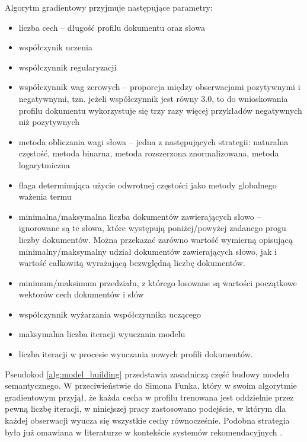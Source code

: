 \documentclass{pracamgr}
\begin{document}
Algorytm gradientowy przyjmuje następujące parametry:
\begin{itemize}
    \item liczba cech -- długość profilu dokumentu oraz słowa
    \item współczynik uczenia
    \item współczynnik regularyzacji
    \item współczynnik wag zerowych -- proporcja między obserwacjami pozytywnymi i negatywnymi, tzn. jeżeli współczynnik jest równy 3.0, to do wnioskowania profilu dokumentu wykorzystuje się trzy razy więcej przykładów negatywnych niż pozytywnych
    \item metoda obliczania wagi słowa -- jedna z następujących strategii: naturalna częstość, metoda binarna, metoda rozszerzona znormalizowana, metoda logarytmiczna
    \item flaga determinująca użycie odwrotnej częstości jako metody globalnego ważenia termu
    \item minimalna/maksymalna liczba dokumentów zawierających słowo -- ignorowane są te słowa, które występują poniżej/powyżej zadanego progu liczby dokumentów. Można przekazać zarówno wartość wymierną opisującą minimalny/maksymalny udział dokumentów zawierających słowo, jak i wartość całkowitą wyrażającą bezwględną liczbę dokumentów.
    \item minimum/maksimum przedziału, z którego losowane są wartości początkowe wektorów cech dokumentów i słów
    \item współczynnik wyżarzania współczynnika uczącego
    \item maksymalna liczba iteracji wyuczania modelu
    \item liczba iteracji w procesie wyuczania nowych profili dokumentów.
\end{itemize}

Pseudokod \ref{alg:model_building} przedstawia zasadniczą część budowy modelu semantycznego. W przeciwieństwie do Simona Funka, który w swoim algorytmie gradientowym przyjął, że każda cecha w profilu trenowana jest oddzielnie przez pewną liczbę iteracji, w niniejszej pracy zastosowano podejście, w którym dla każdej obserwacji wyucza się wszystkie cechy równocześnie. Podobna strategia była już omawiana w literaturze w kontekście systemów rekomendacyjnych \cite{takacs}. 
\end{document}
